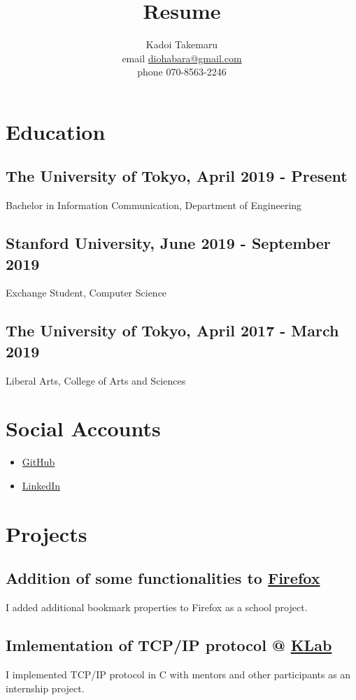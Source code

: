 \documentclass{article}
\title{Resume}
\author{Kadoi Takemaru \\ email \href{mailto:diohabara@gmail.com}{diohabara@gmail.com} \\ phone 070-8563-2246}
\begin{document}
\maketitle

\section*{Education}
  \subsection*{The University of Tokyo, April 2019 - Present}
    Bachelor in Information Communication, Department of Engineering
  \subsection*{Stanford University, June 2019 - September 2019}
    Exchange Student, Computer Science
  \subsection*{The University of Tokyo, April 2017 - March 2019}
    Liberal Arts, College of Arts and Sciences

\section*{Social Accounts}
  \begin{itemize}
    \item \href{https://github.com/diohabara/}{GitHub}
    \item \href{https://www.linkedin.com/in/takemaru-kadoi-6950b5172/}{LinkedIn}
  \end{itemize}

\section*{Projects}
  \subsection*{Addition of some functionalities to \href{https://slides.com/diohabara/deck}{Firefox}}
    I added additional bookmark properties to Firefox as a school project.
  
  \subsection*{Imlementation of TCP/IP protocol @ \href{https://www.klab.com/en/}{KLab}}
    I implemented TCP/IP protocol in C with mentors and other participants as an internship project.
\end{document}
